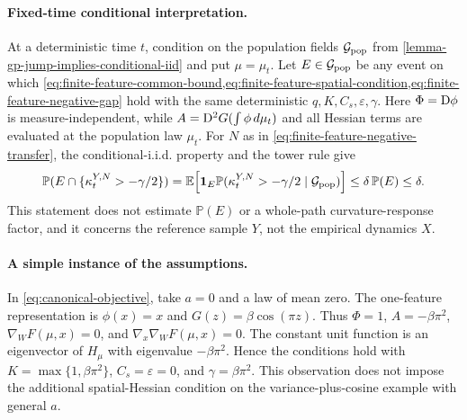 \paragraph{Fixed-time conditional interpretation.}
At a deterministic time $t$, condition on the population fields
$\mathcal G_{\rm pop}$ from \cref{lemma-gp-jump-implies-conditional-iid}
and put $\mu=\mu_t$. Let $E\in\mathcal G_{\rm pop}$ be any event on
which
\cref{eq:finite-feature-common-bound,eq:finite-feature-spatial-condition,eq:finite-feature-negative-gap}
hold with the same deterministic $q,K,C_s,\varepsilon,\gamma$.
Here $\Phi=\mathrm{D}\phi$ is measure-independent, while
$A=\mathrm{D}^2G(\int\phi\,d\mu_t)$ and all Hessian terms are evaluated at
the population law $\mu_t$.
For $N$ as in \eqref{eq:finite-feature-negative-transfer}, the
conditional-i.i.d. property and the tower rule give
\[
 \mathbb P(E\cap\{\kappa_t^{Y,N}>-\gamma/2\})
 =\mathbb E\!\left[\mathbf1_E
    \mathbb P(\kappa_t^{Y,N}>-\gamma/2\mid\mathcal G_{\rm pop})\right]
 \le\delta\,\mathbb P(E)\le\delta.
\]
This statement does not estimate $\mathbb P(E)$ or a whole-path curvature-response factor,
and it concerns the reference sample $Y$, not the empirical dynamics $X$.

\paragraph{A simple instance of the assumptions.}
In \eqref{eq:canonical-objective}, take $a=0$ and a law of mean zero.
The one-feature representation is $\phi(x)=x$ and
$G(z)=\beta\cos(\pi z)$. Thus $\Phi=1$, $A=-\beta\pi^2$,
$\nabla_WF(\mu,x)=0$, and $\nabla_x\nabla_WF(\mu,x)=0$.
The constant unit function is an eigenvector of $H_\mu$ with
eigenvalue $-\beta\pi^2$. Hence the conditions hold with
$K=\max\{1,\beta\pi^2\}$, $C_s=\varepsilon=0$, and
$\gamma=\beta\pi^2$. This observation does not impose the additional
spatial-Hessian condition on the variance-plus-cosine example with general $a$.
